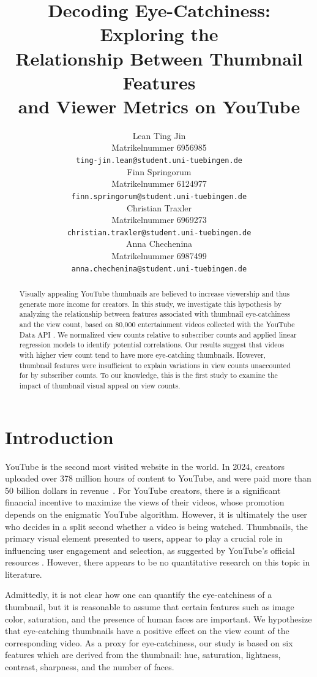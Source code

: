 \documentclass{article}
\title{Decoding Eye-Catchiness: Exploring the\\Relationship Between Thumbnail Features\\and Viewer Metrics on YouTube}
\author{%
  Lean Ting Jin\\
  Matrikelnummer 6956985\\
  \fontsize{8.5}{11}\texttt{ting-jin.lean@student.uni-tuebingen.de} \\
  \And
  Finn Springorum\\
  Matrikelnummer 6124977\\
  \fontsize{8.5}{11}\texttt{finn.springorum@student.uni-tuebingen.de} \\
  \And
  Christian Traxler\\
  Matrikelnummer 6969273\\
  \fontsize{8.5}{11}\texttt{christian.traxler@student.uni-tuebingen.de} \\
  \And
  Anna Chechenina\\
  Matrikelnummer 6987499\\
  \fontsize{8.5}{11}\texttt{anna.chechenina@student.uni-tuebingen.de} \\
}
\begin{document}
\maketitle

\begin{abstract}
Visually appealing YouTube thumbnails are believed to increase viewership and thus generate more income for creators. In this study, we investigate this hypothesis by analyzing the relationship between features associated with thumbnail eye-catchiness and the view count, based on 80,000 entertainment videos collected with the YouTube Data API \cite{youtubeapi}. We normalized view counts relative to subscriber counts and applied linear regression models to identify potential correlations. Our results suggest that videos with higher view count tend to have more eye-catching thumbnails. However, thumbnail features were insufficient to explain variations in view counts unaccounted for by subscriber counts. To our knowledge, this is the first study to examine the impact of thumbnail visual appeal on view counts.
\end{abstract}

\section{Introduction}
YouTube is the second most visited website in the world. In 2024, creators uploaded over 378 million hours of content to YouTube, and were paid more than 50 billion dollars in revenue~\cite{youtube-stats}. For YouTube creators, there is a significant financial incentive to maximize the views of their videos, whose promotion depends on the enigmatic YouTube algorithm. However, it is ultimately the user who decides in a split second whether a video is being watched. Thumbnails, the primary visual element presented to users, appear to play a crucial role in influencing user engagement and selection, as suggested by YouTube's official resources \cite{YouTubeThumbnail}. However, there appears to be no quantitative research on this topic in literature.


Admittedly, it is not clear how one can quantify the eye-catchiness of a thumbnail, but it is reasonable to assume that certain features such as image color, saturation, and the presence of human faces are important. We hypothesize that eye-catching thumbnails have a positive effect on the view count of the corresponding video. As a proxy for eye-catchiness, our study is based on six features which are derived from the thumbnail: hue, saturation, lightness, contrast, sharpness, and the number of faces.
\end{document}

